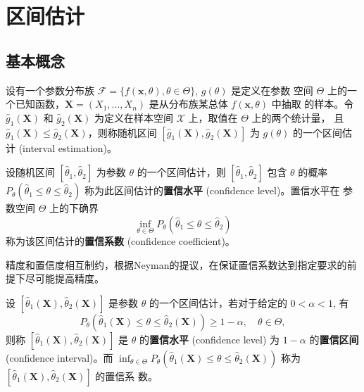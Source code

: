 \section{区间估计}\label{sec:区间估计}
\subsection{基本概念}\label{subsec:基本概念}
\begin{definition}[区间估计]\label{def:interval_estimation}
设有一个参数分布族 $\mathcal{F}=\{f(\mathbf{x}, \theta), \theta \in \Theta\}$, $g(\theta)$ 是定义在参数
空间 $\Theta$ 上的一个已知函数，$\mathbf{X} = (X_1, \dots, X_n)$ 是从分布族某总体 $f(\mathbf{x}, \theta)$ 中抽取
的样本。令 $\hat{g}_1(\mathbf{X})$ 和 $\hat{g}_2(\mathbf{X})$ 为定义在样本空间 $\mathcal{X}$ 上，取值在 $\Theta$ 上的两个统计量，
且 $\hat{g}_1(\mathbf{X}) \leq \hat{g}_2(\mathbf{X})$，则称随机区间 $[\hat{g}_1(\mathbf{X}), \hat{g}_2(\mathbf{X})]$ 为 $g(\theta)$ 的一个区间估计 (interval
estimation)。
\end{definition}

\begin{definition}[置信水平与置信系数]\label{def:confidence_level_coefficient}
设随机区间 $[\hat{\theta}_1, \hat{\theta}_2]$ 为参数 $\theta$ 的一个区间估计，则 $[\hat{\theta}_1, \hat{\theta}_2]$ 包含 $\theta$
的概率 $P_\theta(\hat{\theta}_1 \le \theta \le \hat{\theta}_2)$ 称为此区间估计的\textbf{置信水平} (confidence level)。置信水平在
参数空间 $\Theta$ 上的下确界
$$\inf_{\theta \in \Theta} P_\theta(\hat{\theta}_1 \le \theta \le \hat{\theta}_2)$$
称为该区间估计的\textbf{置信系数} (confidence coefficient)。
\end{definition}
\begin{remark}
    精度和置信度相互制约，根据Neyman的提议，在保证置信系数达到指定要求的前提下尽可能提高精度。
\end{remark}

\begin{definition}[置信区间]\label{def:confidence_interval}
设 $[\hat{\theta}_1(\mathbf{X}), \hat{\theta}_2(\mathbf{X})]$ 是参数 $\theta$ 的一个区间估计，若对于给定的 $0 <
\alpha < 1$, 有
\begin{equation}
P_\theta(\hat{\theta}_1(\mathbf{X}) \le \theta \le \hat{\theta}_2(\mathbf{X})) \ge 1-\alpha, \quad \theta \in \Theta, \label{eq:confidence_interval_condition}
\end{equation}
则称 $[\hat{\theta}_1(\mathbf{X}), \hat{\theta}_2(\mathbf{X})]$ 是 $\theta$ 的\textbf{置信水平} (confidence level) 为 $1-\alpha$ 的\textbf{置信区间}
(confidence interval)。而 $\inf_{\theta \in \Theta} P_\theta(\hat{\theta}_1(\mathbf{X}) \le \theta \le \hat{\theta}_2(\mathbf{X}))$ 称为 $[\hat{\theta}_1(\mathbf{X}), \hat{\theta}_2(\mathbf{X})]$ 的置信系
数。
\end{definition}

